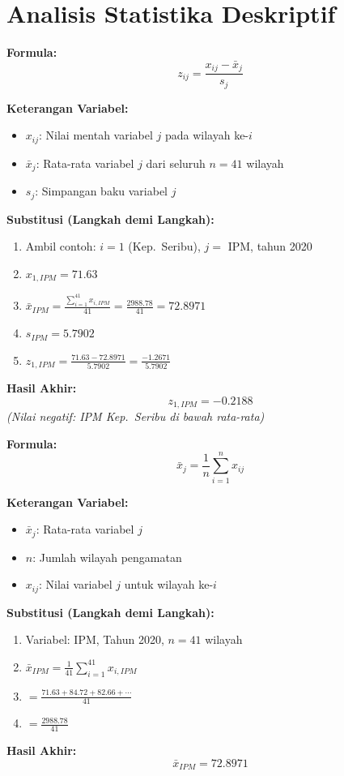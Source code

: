 \documentclass[11pt,a4paper]{article}
\begin{document}
\section{Analisis Statistika Deskriptif}
\begin{tcolorbox}[formula_box, title={1. Standardisasi Data (Z-Score)}]
\textbf{Formula:}
\[ z_{ij} = \frac{x_{ij} - \bar{x}_j}{s_j} \]

\textbf{Keterangan Variabel:}
\begin{itemize}
  \item $x_{ij}$: Nilai mentah variabel $j$ pada wilayah ke-$i$
  \item $\bar{x}_j$: Rata-rata variabel $j$ dari seluruh $n=41$ wilayah
  \item $s_j$: Simpangan baku variabel $j$
\end{itemize}

\textbf{Substitusi (Langkah demi Langkah):}
\begin{enumerate}
  \item Ambil contoh: $i = 1$ (Kep.\ Seribu), $j = $ IPM, tahun 2020
  \item $x_{1,IPM} = 71.63$
  \item $\bar{x}_{IPM} = \frac{\sum_{i=1}^{41} x_{i,IPM}}{41} = \frac{2988.78}{41} = 72.8971$
  \item $s_{IPM} = 5.7902$
  \item $z_{1,IPM} = \frac{71.63 - 72.8971}{5.7902} = \frac{-1.2671}{5.7902}$
\end{enumerate}

\textbf{Hasil Akhir:}
\[ z_{1,IPM} = -0.2188 \]
\textit{(Nilai negatif: IPM Kep.\ Seribu di bawah rata-rata)}
\end{tcolorbox}

\begin{tcolorbox}[formula_box, title={2. Rata-Rata (Mean)}]
\textbf{Formula:}
\[ \bar{x}_j = \frac{1}{n} \sum_{i=1}^{n} x_{ij} \]

\textbf{Keterangan Variabel:}
\begin{itemize}
  \item $\bar{x}_j$: Rata-rata variabel $j$
  \item $n$: Jumlah wilayah pengamatan
  \item $x_{ij}$: Nilai variabel $j$ untuk wilayah ke-$i$
\end{itemize}

\textbf{Substitusi (Langkah demi Langkah):}
\begin{enumerate}
  \item Variabel: IPM, Tahun 2020, $n = 41$ wilayah
  \item $\bar{x}_{IPM} = \frac{1}{41} \sum_{i=1}^{41} x_{i,IPM}$
  \item $= \frac{71.63 + 84.72 + 82.66 + \cdots}{41}$
  \item $= \frac{2988.78}{41}$
\end{enumerate}

\textbf{Hasil Akhir:}
\[ \bar{x}_{IPM} = 72.8971 \]
\end{tcolorbox}
\end{document}
